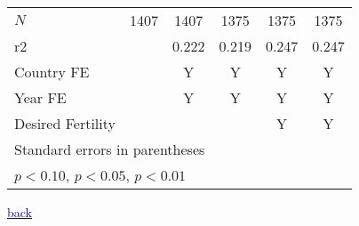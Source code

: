 \documentclass[10pt,letterpaper,subeqn]{beamer}
\begin{document}
\begin{frame}[label=placebo2]
\begin{table}[htbp]
\begin{tabular}{l*{5}{c}}
\hline
\(N\)       &        1407         &        1407         &        1375         &        1375         &        1375         \\
r2          &                     &       0.222         &       0.219         &       0.247         &       0.247         \\
\hline
Country FE        &                     &    Y                 &      Y               &     Y         &               Y         \\
Year FE            &                     &    Y                 &      Y               &     Y         &             Y         \\
Desired Fertility &                     &                     &                     &       Y&             Y\\
\hline\hline
\multicolumn{6}{l}{\footnotesize Standard errors in parentheses}\\
\multicolumn{6}{l}{\footnotesize \sym{*} \(p<0.10\), \sym{**} \(p<0.05\), \sym{***} \(p<0.01\)}\\
\end{tabular}
\end{table}
{\footnotesize \hyperlink{placebos}{\textcolor{blue}{back}}}
\end{frame}
\end{document}
